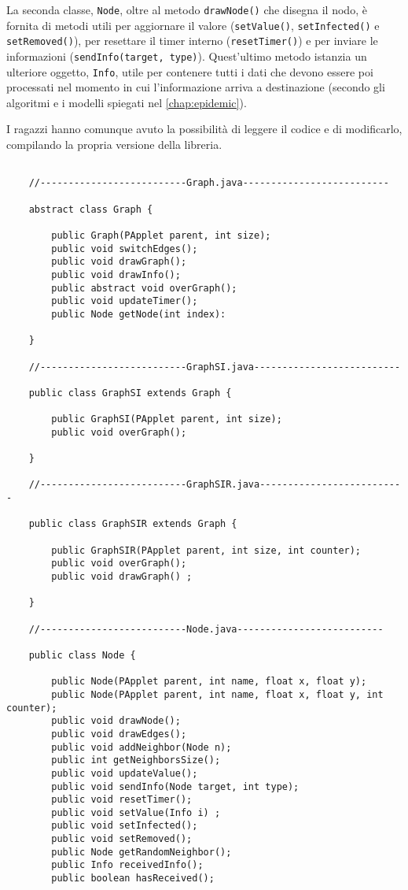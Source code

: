 La seconda classe, \texttt{Node}, oltre al metodo \texttt{drawNode()} che disegna il nodo, è fornita di metodi utili per aggiornare il valore (\texttt{setValue()}, \texttt{setInfected()} e \texttt{setRemoved()}), per resettare il timer interno (\texttt{resetTimer()}) e per inviare le informazioni (\texttt{sendInfo(target, type)}). Quest'ultimo metodo istanzia un ulteriore oggetto, \texttt{Info}, utile per contenere tutti i dati che devono essere poi processati nel momento in cui l'informazione arriva a destinazione (secondo gli algoritmi e i modelli spiegati nel \autoref{chap:epidemic}).

I ragazzi hanno comunque avuto la possibilità di leggere il codice e di modificarlo, compilando la propria versione della libreria.

\newpage
\begin{lstlisting}[label={lst:library_code}, caption={La definizione delle classi principali utilizzate dai ragazzi}]

    //--------------------------Graph.java--------------------------

    abstract class Graph {
    
        public Graph(PApplet parent, int size);
        public void switchEdges();
        public void drawGraph();
        public void drawInfo();
        public abstract void overGraph();
        public void updateTimer();
        public Node getNode(int index):
    
    }
    
    //--------------------------GraphSI.java--------------------------
    
    public class GraphSI extends Graph {
    
        public GraphSI(PApplet parent, int size);
        public void overGraph();
    
    }
    
    //--------------------------GraphSIR.java--------------------------
    
    public class GraphSIR extends Graph {
    
        public GraphSIR(PApplet parent, int size, int counter);
        public void overGraph();
        public void drawGraph() ;
    
    }
    
    //--------------------------Node.java--------------------------
    
    public class Node {
    
        public Node(PApplet parent, int name, float x, float y);
        public Node(PApplet parent, int name, float x, float y, int counter);
        public void drawNode();
        public void drawEdges();
        public void addNeighbor(Node n);
        public int getNeighborsSize();
        public void updateValue();
        public void sendInfo(Node target, int type);
        public void resetTimer();
        public void setValue(Info i) ;
        public void setInfected();
        public void setRemoved();
        public Node getRandomNeighbor();
        public Info receivedInfo();
        public boolean hasReceived();
    

\end{lstlisting}
